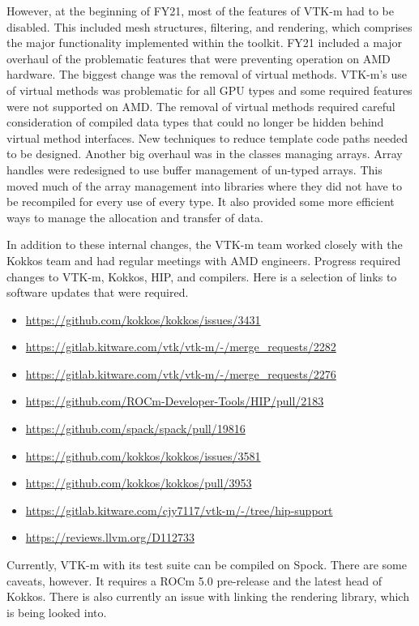 However, at the beginning of FY21, most of the features of VTK-m had to be disabled.
This included mesh structures, filtering, and rendering, which comprises the major functionality implemented within the toolkit.
FY21 included a major overhaul of the problematic features that were preventing operation on AMD hardware.
The biggest change was the removal of virtual methods.
VTK-m's use of virtual methods was problematic for all GPU types and some required features were not supported on AMD.
The removal of virtual methods required careful consideration of compiled data types that could no longer be hidden behind virtual method interfaces.
New techniques to reduce template code paths needed to be designed.
Another big overhaul was in the classes managing arrays.
Array handles were redesigned to use buffer management of un-typed arrays.
This moved much of the array management into libraries where they did not have to be recompiled for every use of every type.
It also provided some more efficient ways to manage the allocation and transfer of data.

In addition to these internal changes, the VTK-m team worked closely with the Kokkos team and had regular meetings with AMD engineers.
Progress required changes to VTK-m, Kokkos, HIP, and compilers.
Here is a selection of links to software updates that were required.

\begin{itemize}
  \setlength{\itemsep}{0pt}
  \setlength{\parskip}{0pt}
  \setlength{\parsep}{0pt}
\item\url{https://github.com/kokkos/kokkos/issues/3431}
\item\url{https://gitlab.kitware.com/vtk/vtk-m/-/merge_requests/2282}
\item\url{https://gitlab.kitware.com/vtk/vtk-m/-/merge_requests/2276}
\item\url{https://github.com/ROCm-Developer-Tools/HIP/pull/2183}
\item\url{https://github.com/spack/spack/pull/19816}
\item\url{https://github.com/kokkos/kokkos/issues/3581}
\item\url{https://github.com/kokkos/kokkos/pull/3953}
\item\url{https://gitlab.kitware.com/cjy7117/vtk-m/-/tree/hip-support}
\item\url{https://reviews.llvm.org/D112733}
\end{itemize}

Currently, VTK-m with its test suite can be compiled on Spock.
There are some caveats, however.
It requires a ROCm 5.0 pre-release and the latest head of Kokkos.
There is also currently an issue with linking the rendering library, which is being looked into.

